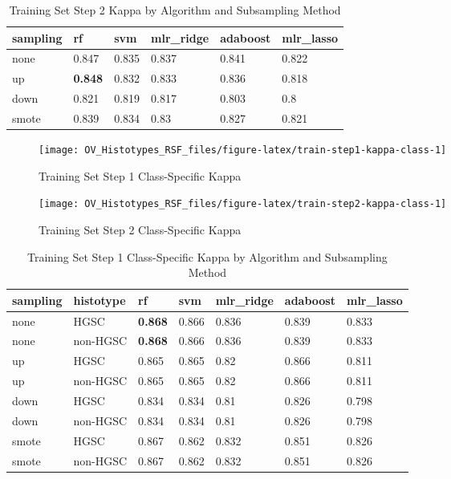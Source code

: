 \documentclass[
]{report}
\begin{document}
\begin{table}

\caption{\label{tab:train-step2-kappa-table}Training Set Step 2 Kappa by Algorithm and Subsampling Method}
\centering
\begin{tabular}[t]{l|l|l|l|l|l}
\hline
sampling & rf & svm & mlr\_ridge & adaboost & mlr\_lasso\\
\hline
none & 0.847 & 0.835 & 0.837 & 0.841 & 0.822\\
\hline
up & \textbf{0.848} & 0.832 & 0.833 & 0.836 & 0.818\\
\hline
down & 0.821 & 0.819 & 0.817 & 0.803 & 0.8\\
\hline
smote & 0.839 & 0.834 & 0.83 & 0.827 & 0.821\\
\hline
\end{tabular}
\end{table}

\begin{figure}[H]

{\centering \texttt{[image: OV\_Histotypes\_RSF\_files/figure-latex/train-step1-kappa-class-1]} 

}

\caption{Training Set Step 1 Class-Specific Kappa}\label{fig:train-step1-kappa-class}
\end{figure}

\begin{figure}[H]

{\centering \texttt{[image: OV\_Histotypes\_RSF\_files/figure-latex/train-step2-kappa-class-1]} 

}

\caption{Training Set Step 2 Class-Specific Kappa}\label{fig:train-step2-kappa-class}
\end{figure}

\begin{table}

\caption{\label{tab:train-step1-kappa-class-table}Training Set Step 1 Class-Specific Kappa by Algorithm and Subsampling Method}
\centering
\begin{tabular}[t]{l|l|l|l|l|l|l}
\hline
sampling & histotype & rf & svm & mlr\_ridge & adaboost & mlr\_lasso\\
\hline
none & HGSC & \textbf{0.868} & 0.866 & 0.836 & 0.839 & 0.833\\
\hline
none & non-HGSC & \textbf{0.868} & 0.866 & 0.836 & 0.839 & 0.833\\
\hline
up & HGSC & 0.865 & 0.865 & 0.82 & 0.866 & 0.811\\
\hline
up & non-HGSC & 0.865 & 0.865 & 0.82 & 0.866 & 0.811\\
\hline
down & HGSC & 0.834 & 0.834 & 0.81 & 0.826 & 0.798\\
\hline
down & non-HGSC & 0.834 & 0.834 & 0.81 & 0.826 & 0.798\\
\hline
smote & HGSC & 0.867 & 0.862 & 0.832 & 0.851 & 0.826\\
\hline
smote & non-HGSC & 0.867 & 0.862 & 0.832 & 0.851 & 0.826\\
\hline
\end{tabular}
\end{table}
\end{document}
